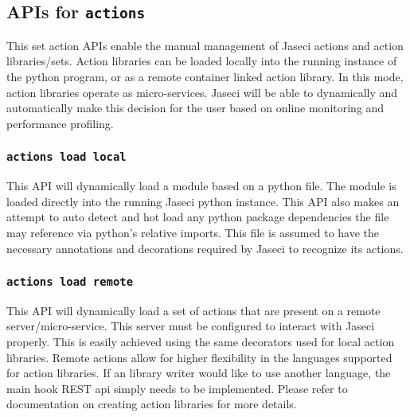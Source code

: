 \subsection{APIs for \lstinline[basicstyle=\Large\ttfamily]$actions$}

\par
This set action APIs enable the manual management of Jaseci actions and action
libraries/sets. Action libraries can be loaded locally into the running instance of
the python program, or as a remote container linked action library. In this mode,
action libraries operate as micro-services. Jaseci will be able to dynamically
and automatically make this decision for the user based on online monitoring and
performance profiling.

\subsubsection{\lstinline[basicstyle=\Large\ttfamily]$actions load local$}

{This API will dynamically load a module based on a python file. The module
is loaded directly into the running Jaseci python instance. This API also
makes an attempt to auto detect and hot load any python package dependencies
the file may reference via python's relative imports. This file is assumed to
have the necessary annotations and decorations required by Jaseci to recognize
its actions.\vspace{4mm}\par
{}}
\subsubsection{\lstinline[basicstyle=\Large\ttfamily]$actions load remote$}

{This API will dynamically load a set of actions that are present on a remote
server/micro-service. This server must be configured to interact with Jaseci
properly. This is easily achieved using the same decorators used for local
action libraries. Remote actions allow for higher flexibility in the languages
supported for action libraries. If an  library writer would like to use another
language, the main hook REST api simply needs to be implemented. Please
refer to documentation on creating action libraries for more details.\vspace{4mm}\par
{}}
